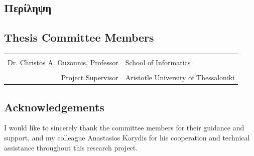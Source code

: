 \documentclass[a4paper,12pt]{extarticle}
\begin{document}
  \lipsum[1]
    
  \vspace{\fill}

  \subsection*{%
    \center Περίληψη
  }

  \lipsum[1]
  
  \vspace{\fill}
  
  \cleardoublepage

  
  \thispagestyle{firstpages}
  
  \vspace*{\fill}
  
  \subsection*{%
    Thesis Committee Members
  }

  \begin{tabular}{r p{12cm}}
    \multicolumn{2}{c}{} \\

      Dr. Christos A. Ouzounis, Professor & School of Informatics \\
      \\[-3.5mm]
      Project Supervisor & Aristotle University of Thessaloniki
    \end{tabular}

  \vspace{7.0mm}

  \subsection*{%
    Acknowledgements
  }

  I would like to sincerely thank the committee members for their guidance and support, and my colleague Anastasios Karydis for his cooperation and technical assistance throughout this research project.

  \vspace{\fill}
\end{document}
